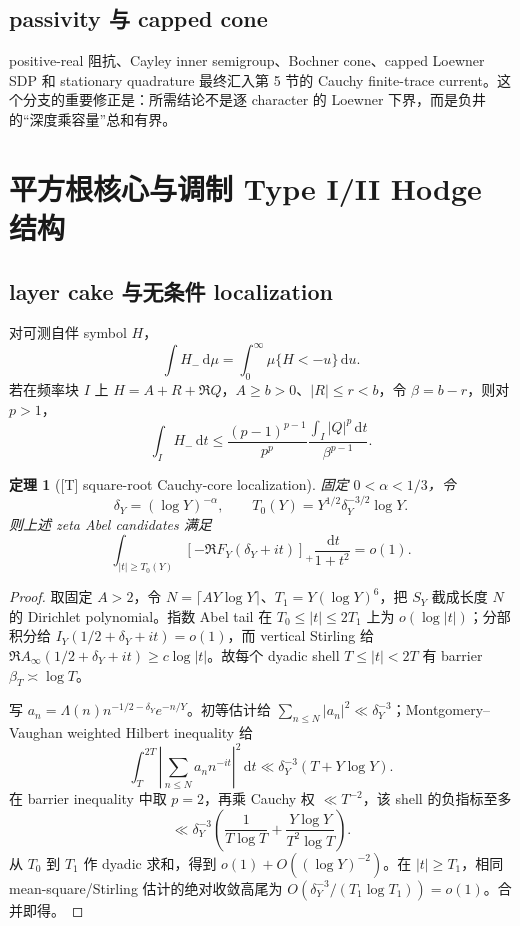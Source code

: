 \documentclass[UTF8,11pt,a4paper]{ctexart}
\newtheorem{theorem}{定理}[section]
\theoremstyle{definition}
\theoremstyle{remark}
\newcommand{\dd}{\,\mathrm d}
\newcommand{\1}{\mathbf 1}
\newcommand{\statusT}{\textnormal{[T]}}
\begin{document}
\subsection{passivity 与 capped cone}

positive-real 阻抗、Cayley inner semigroup、Bochner cone、capped Loewner SDP 和 stationary quadrature 最终汇入第 5 节的 Cauchy finite-trace current。这个分支的重要修正是：所需结论不是逐 character 的 Loewner 下界，而是负井的“深度乘容量”总和有界。

\section{平方根核心与调制 Type I/II Hodge 结构}

\subsection{layer cake 与无条件 localization}

对可测自伴 symbol $H$，
\[
  \int H_-\dd\mu=\int_0^\infty\mu\{H<-u\}\dd u.
\]
若在频率块 $I$ 上
$H=A+R+\Re Q$，$A\geq b>0$、$|R|\leq r<b$，令 $\beta=b-r$，则对 $p>1$，
\[
  \int_IH_-\dd t
  \leq \frac{(p-1)^{p-1}}{p^p}\frac{\int_I|Q|^p\dd t}{\beta^{p-1}}.
\]
\begin{theorem}[\statusT{} square-root Cauchy-core localization]\label{thm:sqrtcore}
固定 $0<\alpha<1/3$，令
\[
 \delta_Y=(\log Y)^{-\alpha},\qquad
 T_0(Y)=Y^{1/2}\delta_Y^{-3/2}\log Y.
\]
则上述 zeta Abel candidates 满足
\[
 \int_{|t|\geq T_0(Y)}[-\Re F_Y(\delta_Y+it)]_+
 \frac{\dd t}{1+t^2}=o(1).
\]
\end{theorem}

\begin{proof}
取固定 $A>2$，令 $N=\lceil AY\log Y\rceil$、$T_1=Y(\log Y)^6$，把 $S_Y$ 截成长度 $N$ 的 Dirichlet polynomial。指数 Abel tail 在 $T_0\leq|t|\leq2T_1$ 上为 $o(\log|t|)$；分部积分给 $I_Y(1/2+\delta_Y+it)=o(1)$，而 vertical Stirling 给
$\Re A_\infty(1/2+\delta_Y+it)\geq c\log|t|$。故每个 dyadic shell $T\leq|t|<2T$ 有 barrier $\beta_T\asymp\log T$。

写 $a_n=\Lambda(n)n^{-1/2-\delta_Y}e^{-n/Y}$。初等估计给
$\sum_{n\leq N}|a_n|^2\ll\delta_Y^{-3}$；Montgomery--Vaughan weighted Hilbert inequality\cite{MontgomeryVaughan} 给
\[
 \int_T^{2T}\left|\sum_{n\leq N}a_nn^{-it}\right|^2\dd t
 \ll\delta_Y^{-3}(T+Y\log Y).
\]
在 barrier inequality 中取 $p=2$，再乘 Cauchy 权 $\ll T^{-2}$，该 shell 的负指标至多
\[
 \ll\delta_Y^{-3}\left(\frac1{T\log T}
 +\frac{Y\log Y}{T^2\log T}\right).
\]
从 $T_0$ 到 $T_1$ 作 dyadic 求和，得到 $o(1)+O((\log Y)^{-2})$。在 $|t|\geq T_1$，相同 mean-square/Stirling 估计的绝对收敛高尾为
$O(\delta_Y^{-3}/(T_1\log T_1))=o(1)$。合并即得。
\end{proof}
\end{document}
